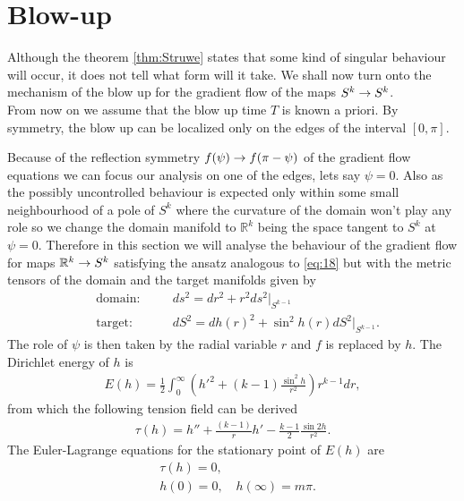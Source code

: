 \section{Blow-up}
\label{sec:blow-up}

Although the theorem \ref{thm:Struwe} states that some kind of
singular behaviour will occur, it does not tell what form will it
take. We shall now turn onto the mechanism of the blow up for the
gradient flow of the maps $S^k\rightarrow S^k$.\\

From now on we assume that the blow up time $T$ is known a priori. By
symmetry, the blow up can be localized only on the edges of the
interval $[0,\pi]$.%

Because of the reflection symmetry $f(\psi)\rightarrow f(\pi-\psi)$ of the
gradient flow equations we can focus our analysis on one of the edges,
lets say $\psi=0$. Also as the possibly uncontrolled behaviour is
expected only within some small neighbourhood of a pole of $S^k$ where
the curvature of the domain won't play any role so we change the
domain manifold to $\mathbb{R}^k$ being the space tangent to $S^k$ at
$\psi=0$. Therefore in this section we will analyse the behaviour of
the gradient flow for maps $\mathbb{R}^k\rightarrow S^k$ satisfying the ansatz
analogous to \eqref{eq:18} but with the metric tensors of the domain
and the target manifolds given by
\begin{align}\label{eq:71}
  &\text{domain:}&\quad &ds^2=dr^2+r^2ds^2\big|_{S^{k-1}}\\
  &\text{target:}&\quad &dS^2=dh(r)^2+\sin^2h(r)dS^2\big|_{S^{k-1}}.
\end{align}
The role of $\psi$ is then taken by the radial variable $r$ and $f$ is
replaced by $h$. The Dirichlet energy of $h$ is
\begin{align}
  \label{eq:72}
  E(h)=\frac{1}{2}\int_0^\infty \left(h'^2+(k-1)\frac{\sin^2
      h}{r^2}\right)r^{k-1}dr,
\end{align}
from which the following tension field can be derived
\begin{align}
  \label{eq:73}
  \tau(h)=h''+\frac{(k-1)}{r}h'-\frac{k-1}{2}\frac{\sin2h}{r^2}.
\end{align}
The Euler-Lagrange equations for the stationary point of $E(h)$ are
\begin{align}
  \label{eq:74}
  &\tau(h)=0,\\
  &h(0)=0,\quad h(\infty)=m\pi.
\end{align}
